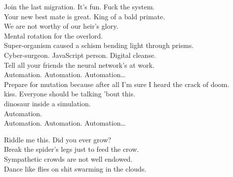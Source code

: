 
\label{album:kg}








Join the last migration. It's fun. Fuck the system. \\
Your new best mate is great. King of a bald primate. \\
We are not worthy of our heir's glory. \\
Mental rotation for the overlord. \\

Super-organism caused a schism bending light through prisms. \\
Cyber-surgeon. JavaScript person. Digital cleanse. \\
Tell all your friends the neural network's at work. \\

Automation. Automation. Automation… \\

Prepare for mutation because after all I'm sure I heard the crack of doom. \\
 kiss. Everyone should be talking 'bout this. \\
  dinosaur inside a simulation. \\
Automation. \\

Automation. Automation. Automation… \\




Riddle me this. Did you ever grow? \\
Break the spider's legs just to feed the crow. \\
Sympathetic crowds are not well endowed. \\
Dance like flies on shit swarming in the clouds. \\

